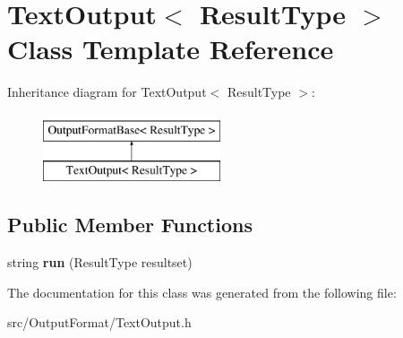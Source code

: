 \hypertarget{class_text_output}{\section{Text\-Output$<$ Result\-Type $>$ Class Template Reference}
\label{class_text_output}
}
Inheritance diagram for Text\-Output$<$ Result\-Type $>$\-:\begin{figure}[H]
\begin{center}
\leavevmode
\includegraphics[height=2.000000cm]{class_text_output}
\end{center}
\end{figure}
\subsection*{Public Member Functions}
\begin{DoxyCompactItemize}
\item 
\hypertarget{class_text_output_abffc4340c306db95301de40fa0da36dc}{string {\bfseries run} (Result\-Type resultset)}\label{class_text_output_abffc4340c306db95301de40fa0da36dc}

\end{DoxyCompactItemize}


The documentation for this class was generated from the following file\-:\begin{DoxyCompactItemize}
\item 
src/\-Output\-Format/Text\-Output.\-h\end{DoxyCompactItemize}
